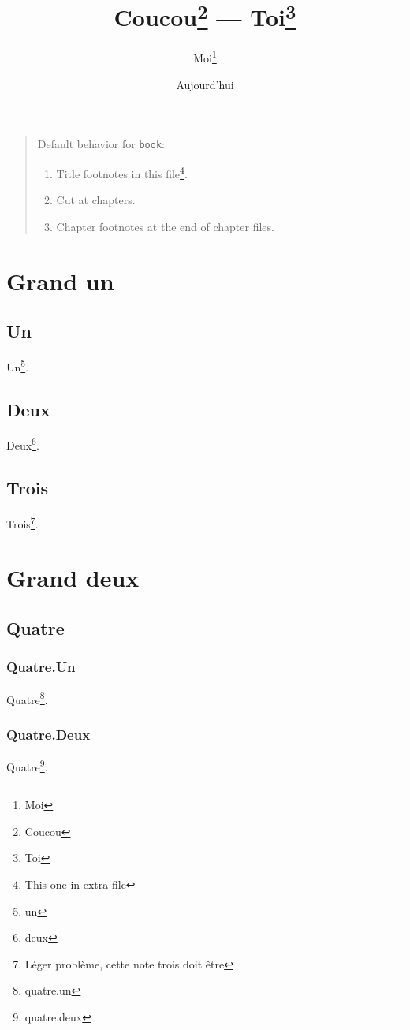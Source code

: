 \documentclass{book}
\begin{document}
\title{Coucou\footnote{Coucou} --- Toi\footnote{Toi}}
\author{Moi\thanks{Moi}}
\date{Aujourd'hui}
\maketitle
\begin{quote}
Default \hacha{} behavior for \texttt{book}:
\begin{enumerate}
\item Title footnotes in this file\footnote{This one in extra file}.
\item Cut at chapters.
\item Chapter footnotes at the end of chapter files.
\end{enumerate}
\end{quote}
\tableofcontents
\part{Grand un}
\chapter{Un}
Un\footnote{un}.
\chapter{Deux}
Deux\footnote{deux}.
\chapter{Trois}
Trois\footnote{L\'eger probl\`eme, cette note trois doit \^etre}.
\part{Grand deux}
\chapter{Quatre}
\section{Quatre.Un}
Quatre\footnote{quatre.un}.
\section{Quatre.Deux}
Quatre\footnote{quatre.deux}.
\end{document}
